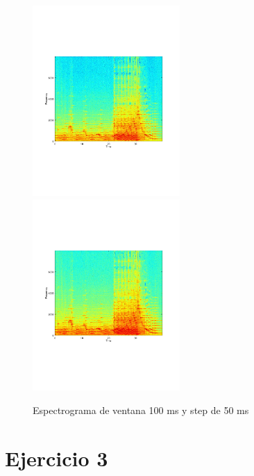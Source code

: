 \documentclass[paper=a4, fontsize=11pt]{scrartcl} %
\numberwithin{equation}{section} %
\numberwithin{figure}{section} %
\numberwithin{table}{section} %
\begin{document}
\begin{figure}[t]
\includegraphics[width=0.5\textwidth]{../images/specgram_w100s50.pdf}
\includegraphics[width=0.5\textwidth]{../images/specgram_w68s34.pdf}
\caption{Espectrograma de ventana 100 ms y step de 50 ms}

\end{figure}


\newpage

\section{Ejercicio 3}
\end{document}
